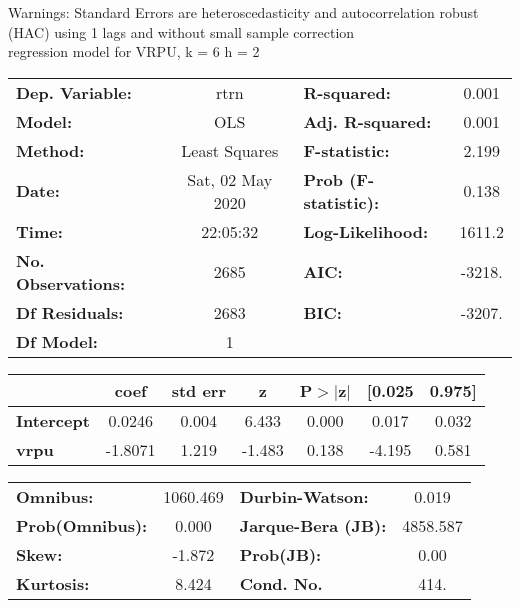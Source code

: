 Warnings: \newline
 [1] Standard Errors are heteroscedasticity and autocorrelation robust (HAC) using 1 lags and without small sample correction\\ 

regression model for VRPU, k = 6 h = 2\begin{center}
\begin{tabular}{lclc}
\toprule
\textbf{Dep. Variable:}    &       rtrn       & \textbf{  R-squared:         } &     0.001   \\
\textbf{Model:}            &       OLS        & \textbf{  Adj. R-squared:    } &     0.001   \\
\textbf{Method:}           &  Least Squares   & \textbf{  F-statistic:       } &     2.199   \\
\textbf{Date:}             & Sat, 02 May 2020 & \textbf{  Prob (F-statistic):} &    0.138    \\
\textbf{Time:}             &     22:05:32     & \textbf{  Log-Likelihood:    } &    1611.2   \\
\textbf{No. Observations:} &        2685      & \textbf{  AIC:               } &    -3218.   \\
\textbf{Df Residuals:}     &        2683      & \textbf{  BIC:               } &    -3207.   \\
\textbf{Df Model:}         &           1      & \textbf{                     } &             \\
\bottomrule
\end{tabular}
\begin{tabular}{lcccccc}
                   & \textbf{coef} & \textbf{std err} & \textbf{z} & \textbf{P$> |$z$|$} & \textbf{[0.025} & \textbf{0.975]}  \\
\midrule
\textbf{Intercept} &       0.0246  &        0.004     &     6.433  &         0.000        &        0.017    &        0.032     \\
\textbf{vrpu}      &      -1.8071  &        1.219     &    -1.483  &         0.138        &       -4.195    &        0.581     \\
\bottomrule
\end{tabular}
\begin{tabular}{lclc}
\textbf{Omnibus:}       & 1060.469 & \textbf{  Durbin-Watson:     } &    0.019  \\
\textbf{Prob(Omnibus):} &   0.000  & \textbf{  Jarque-Bera (JB):  } & 4858.587  \\
\textbf{Skew:}          &  -1.872  & \textbf{  Prob(JB):          } &     0.00  \\
\textbf{Kurtosis:}      &   8.424  & \textbf{  Cond. No.          } &     414.  \\
\bottomrule
\end{tabular}
\end{center}


